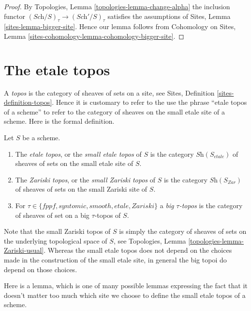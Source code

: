 \begin{proof}
By
Topologies, Lemma \ref{topologies-lemma-change-alpha}
the inclusion functor $(\textit{Sch}/S)_\tau \to (\textit{Sch}'/S)_\tau$
satisfies the assumptions of
Sites, Lemma \ref{sites-lemma-bigger-site}.
Hence our lemma follows from
Cohomology on Sites, Lemma \ref{sites-cohomology-lemma-cohomology-bigger-site}.
\end{proof}




\section{The etale topos}
\label{section-etale-topos}

\noindent
A {\it topos} is the category of sheaves of sets on a site, see
Sites, Definition \ref{sites-definition-topos}. Hence it is customary
to refer to the use the phrase ``etale topos of a scheme'' to refer to
the category of sheaves on the small etale site of a scheme.
Here is the formal definition.

\begin{definition}
\label{definition-etale-topos}
Let $S$ be a scheme.
\begin{enumerate}
\item The {\it etale topos}, or the {\it small etale topos}
of $S$ is the category $\textit{Sh}(S_{etale})$ of sheaves of sets on the
small etale site of $S$.
\item The {\it Zariski topos}, or the {\it small Zariski topos}
of $S$ is the category $\textit{Sh}(S_{Zar})$ of sheaves of sets on the
small Zariski site of $S$.
\item For $\tau \in \{fppf, syntomic, smooth, etale, Zariski\}$ a
{\it big $\tau$-topos} is the category of sheaves of set on a
big $\tau$-topos of $S$.
\end{enumerate}
\end{definition}

\noindent
Note that the small Zariski topos of $S$ is simply the category of sheaves
of sets on the underlying topological space of $S$, see
Topologies, Lemma \ref{topologies-lemma-Zariski-usual}.
Whereas the small etale topos does not depend on the choices made in the
construction of the small etale site, in general the big topoi do depend
on those choices.

\medskip\noindent
Here is a lemma, which is one of many possible lemmas expressing the
fact that it doesn't matter too much which site we choose to define
the small etale topos of a scheme.

